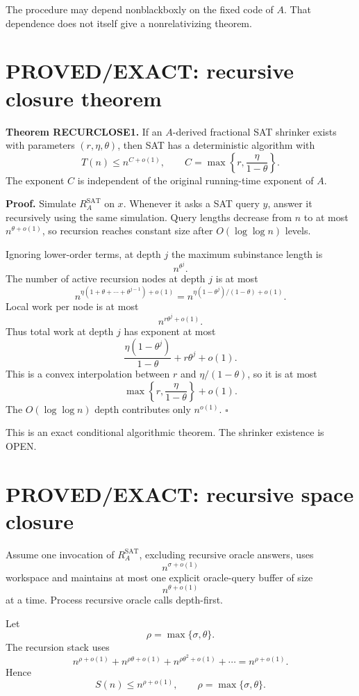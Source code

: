 \documentclass[11pt]{article}
\begin{document}
The procedure may depend nonblackboxly on the fixed code of \(A\). That dependence does not itself give a nonrelativizing theorem.

\section*{PROVED/EXACT: recursive closure theorem}
\textbf{Theorem RECURCLOSE1.}
If an \(A\)-derived fractional SAT shrinker exists with parameters \((r,\eta,\theta)\), then SAT has a deterministic algorithm with
\[
\boxed{
T(n)\le n^{C+o(1)},
\qquad
C=\max\left\{r,\frac{\eta}{1-\theta}\right\}.
}
\]
The exponent \(C\) is independent of the original running-time exponent of \(A\).

\textbf{Proof.}
Simulate \(R_A^{\mathrm{SAT}}\) on \(x\). Whenever it asks a SAT query \(y\), answer it recursively using the same simulation. Query lengths decrease from \(n\) to at most \(n^{\theta+o(1)}\), so recursion reaches constant size after \(O(\log\log n)\) levels.

Ignoring lower-order terms, at depth \(j\) the maximum subinstance length is
\[
n^{\theta^j}.
\]
The number of active recursion nodes at depth \(j\) is at most
\[
n^{\eta(1+\theta+\cdots+\theta^{j-1})+o(1)}
=
n^{\eta(1-\theta^j)/(1-\theta)+o(1)}.
\]
Local work per node is at most
\[
n^{r\theta^j+o(1)}.
\]
Thus total work at depth \(j\) has exponent at most
\[
\frac{\eta(1-\theta^j)}{1-\theta}+r\theta^j+o(1).
\]
This is a convex interpolation between \(r\) and \(\eta/(1-\theta)\), so it is at most
\[
\max\left\{r,\frac{\eta}{1-\theta}\right\}+o(1).
\]
The \(O(\log\log n)\) depth contributes only \(n^{o(1)}\). \(\square\)

This is an exact conditional algorithmic theorem. The shrinker existence is OPEN.

\section*{PROVED/EXACT: recursive space closure}
Assume one invocation of \(R_A^{\mathrm{SAT}}\), excluding recursive oracle answers, uses
\[
n^{\sigma+o(1)}
\]
workspace and maintains at most one explicit oracle-query buffer of size
\[
n^{\theta+o(1)}
\]
at a time. Process recursive oracle calls depth-first.

Let
\[
\rho=\max\{\sigma,\theta\}.
\]
The recursion stack uses
\[
n^{\rho+o(1)}
+
n^{\rho\theta+o(1)}
+
n^{\rho\theta^2+o(1)}
+\cdots
=
n^{\rho+o(1)}.
\]
Hence
\[
\boxed{
S(n)\le n^{\rho+o(1)},
\qquad
\rho=\max\{\sigma,\theta\}.
}
\]
\end{document}
